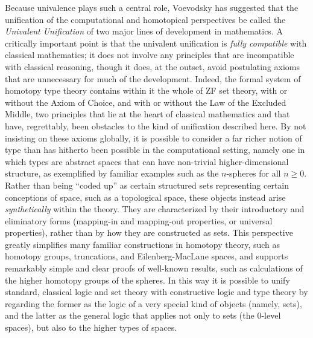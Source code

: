 \documentclass[11pt]{article}
\theoremstyle{remark}
\theoremstyle{definition}
\begin{document}
Because univalence plays such a central role, Voevodsky has suggested that the unification of the computational and homotopical perspectives be called the \emph{Univalent Unification} of two major lines of development in mathematics.  A critically important point is that the univalent unification is \emph{fully compatible} with classical mathematics; it does not involve any principles that are incompatible with classical reasoning, though it does, at the outset, avoid postulating axioms that are unnecessary for much of the development.  Indeed, the formal system of homotopy type theory contains within it the whole of ZF set theory, with or without the Axiom of Choice, and with or without the Law of the Excluded Middle, two principles that lie at the heart of classical mathematics and that have, regrettably, been obstacles to the kind of unification described here.  By not insisting on these axioms globally, it is possible to consider a far richer notion of type than has hitherto been possible in the computational setting, namely one in which types are abstract spaces that can have non-trivial higher-dimensional structure, as exemplified by familiar examples such as the $n$-spheres for all $n\geq 0$.  Rather than being ``coded up'' as certain structured sets representing certain conceptions of space, such as a topological space, these objects instead arise \emph{synthetically} within the theory.  They are characterized by their introductory and eliminatory forms (mapping-in and mapping-out properties, or universal properties), rather than by how they are constructed as sets.  This perspective greatly simplifies many familiar constructions in homotopy theory, such as homotopy groups, truncations, and Eilenberg-MacLane spaces, and supports remarkably simple and clear proofs of well-known results, such as calculations of the higher homotopy groups of the spheres.  In this way it is possible to unify standard, classical logic and set theory with constructive logic and type theory by regarding the former as the logic of a very special kind of objects (namely, sets), and the latter as the general logic that applies not only to sets (the $0$-level spaces), but also to the higher types of spaces.
\end{document}
